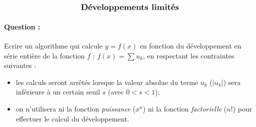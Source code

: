 \documentclass[11pt,a4paper]{article}
\begin{document}
\entete

\autoevaluation


$$\mbox{\textbf{\large Développements limités}}$$


\paragraph{Question :} 
Ecrire un algorithme qui calcule $y = f(x)$ en fonction du développement en série entière de la fonction $f$ : 
$f(x) = \sum u_k$, en respectant les contraintes suivantes :
\begin{itemize}
\item les calculs seront arrêtés lorsque la valeur absolue du terme $u_k$ ($|u_k|$) 
	sera inférieure à un certain seuil $s$ (avec $0 < s < 1$);
\item on n'utilisera ni la fonction \emph{puissance} ($x^n$) ni la fonction
	\emph{facto\-riel\-le} ($n!$) pour effectuer le calcul du développement.
\end{itemize}
\end{document}
